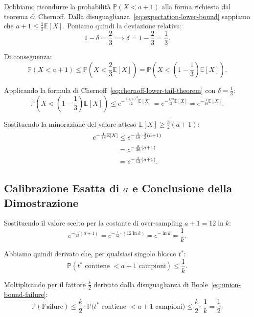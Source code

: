Dobbiamo ricondurre la probabilità $\mathbb{P}(X < a + 1)$ alla forma richiesta dal teorema di Chernoff. Dalla disuguaglianza~\eqref{eq:expectation-lower-bound} sappiamo che $a + 1 \le \frac{2}{3}\mathbb{E}[X]$. Poniamo quindi la deviazione relativa:
\begin{equation}
  1 - \delta = \frac{2}{3} \implies \delta = 1 - \frac{2}{3} = \frac{1}{3}.
\end{equation}

Di conseguenza:
\begin{equation}
  \mathbb{P}(X < a + 1) \le \mathbb{P}\left(X < \frac{2}{3}\mathbb{E}[X]\right) = \mathbb{P}\left(X < \left(1 - \frac{1}{3}\right)\mathbb{E}[X]\right).
\end{equation}

Applicando la formula di Chernoff~\eqref{eq:chernoff-lower-tail-theorem} con $\delta = \frac{1}{3}$:
\begin{equation}
  \mathbb{P}\left(X < \left(1 - \frac{1}{3}\right)\mathbb{E}[X]\right) \le e^{-\frac{(1/3)^2}{2}\mathbb{E}[X]} = e^{-\frac{1/9}{2}\mathbb{E}[X]} = e^{-\frac{1}{18}\mathbb{E}[X]}.
\end{equation}

Sostituendo la minorazione del valore atteso $\mathbb{E}[X] \ge \frac{3}{2}(a + 1)$:
\begin{align}
  e^{-\frac{1}{18}\mathbb{E}[X]} &\le e^{-\frac{1}{18} \cdot \frac{3}{2}(a + 1)} \notag\\
  &= e^{-\frac{3}{36}(a + 1)} \notag\\
  &= e^{-\frac{1}{12}(a + 1)}.
\end{align}

\FloatBarrier
\subsection{Calibrazione Esatta di \texorpdfstring{$a$}{a} e Conclusione della Dimostrazione}
Sostituendo il valore scelto per la costante di over-sampling $a + 1 = 12 \ln k$:
\begin{equation}
  e^{-\frac{1}{12}(a + 1)} = e^{-\frac{1}{12} \cdot (12 \ln k)} = e^{-\ln k} = \frac{1}{k}.
\end{equation}

Abbiamo quindi derivato che, per qualsiasi singolo blocco $t^*$:
\begin{equation}
  \mathbb{P}(t^* \text{ contiene } < a + 1 \text{ campioni}) \le \frac{1}{k}.
\end{equation}

Moltiplicando per il fattore $\frac{k}{2}$ derivato dalla disuguaglianza di Boole~\eqref{eq:union-bound-failure}:
\begin{equation}
  \mathbb{P}(\text{Failure}) \le \frac{k}{2} \cdot \mathbb{P}\big(t^* \text{ contiene } < a + 1 \text{ campioni}\big) \le \frac{k}{2} \cdot \frac{1}{k} = \frac{1}{2}.
\end{equation}

